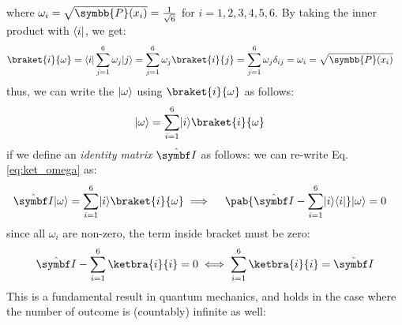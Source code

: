 where $\omega_i = \sqrt{\symbb{P}(x_i)} = \frac{1}{\sqrt{6}}$ for $i = 1, 2, 3, 4, 5, 6$.
By taking the inner product with $\langle i\rvert$, we get:
\begin{align}
  \braket{i}{\omega} & = \bra{i} \sum_{j=1}^{6} \omega_j \ket{j}
  = \sum_{j=1}^{6} \omega_j \braket{i}{j}
  = \sum_{j=1}^{6} \omega_j \delta_{ij}
  = \omega_i = \sqrt{\symbb{P}(x_i)}
\end{align}
thus, we can write the $\lvert\omega\rangle$ using $\braket{i}{\omega}$ as follows:
\begin{align}
  \ket{\omega} & = \sum_{i=1}^{6} \ket{i}\braket{i}{\omega} \label{eq:ket_omega}
\end{align}
if we define an \emph{identity matrix} $\idty$ as follows:
we can re-write Eq.\eqref{eq:ket_omega} as:
\begin{align}
  \idty \ket{\omega} & = \sum_{i=1}^{6} \ket{i}\braket{i}{\omega}
  \implies \quad \pab{\idty - \sum_{i=1}^{6} \ket{i}\bra{i}} \ket{\omega} = 0
\end{align}
since all $\omega_i$ are non-zero, the term inside bracket must be zero:
\begin{align}
  \idty - \sum_{i=1}^{6} \ketbra{i}{i} = 0 \iff \sum_{i=1}^{6} \ketbra{i}{i} = \idty
\end{align}
This is a fundamental result in quantum mechanics, and holds in the case where the number of outcome is (countably) infinite as well:
